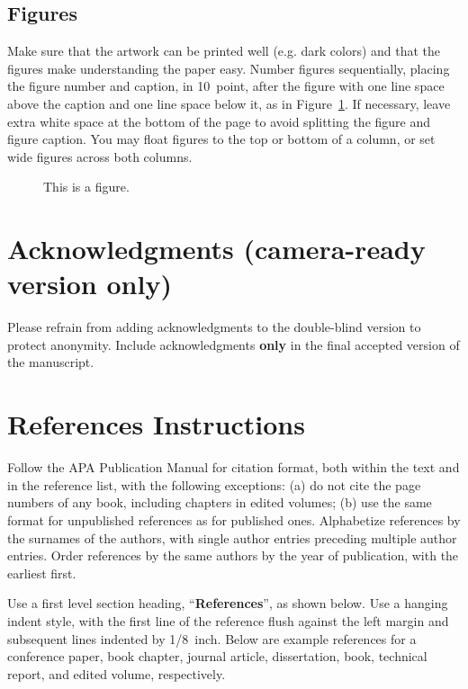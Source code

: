 \documentclass[10pt,letterpaper]{article}
\begin{document}
\subsection{Figures}

Make sure that the artwork can be printed well (e.g. dark colors) and that 
the figures make understanding the paper easy.
 Number figures sequentially, placing the figure
number and caption, in 10~point, after the figure with one line space
above the caption and one line space below it, as in
Figure~\ref{sample-figure}. If necessary, leave extra white space at
the bottom of the page to avoid splitting the figure and figure
caption. You may float figures to the top or bottom of a column, or
set wide figures across both columns.

\begin{figure}[ht]
\begin{center}
\end{center}
\caption{This is a figure.} 
\label{sample-figure}
\end{figure}


\section{Acknowledgments (camera-ready version only)}
Please refrain from adding acknowledgments to the double-blind version to protect anonymity. Include acknowledgments \textbf{only} in the final accepted version of the manuscript. 



\section{References Instructions}

Follow the APA Publication Manual for citation format, both within the
text and in the reference list, with the following exceptions: (a) do
not cite the page numbers of any book, including chapters in edited
volumes; (b) use the same format for unpublished references as for
published ones. Alphabetize references by the surnames of the authors,
with single author entries preceding multiple author entries. Order
references by the same authors by the year of publication, with the
earliest first.

Use a first level section heading, ``{\bf References}'', as shown
below. Use a hanging indent style, with the first line of the
reference flush against the left margin and subsequent lines indented
by 1/8~inch. Below are example references for a conference paper, book
chapter, journal article, dissertation, book, technical report, and
edited volume, respectively.

\nocite{ChalnickBillman1988a}
\nocite{Feigenbaum1963a}
\nocite{Hill1983a}
\nocite{OhlssonLangley1985a}
\nocite{Matlock2001}
\nocite{NewellSimon1972a}
\nocite{ShragerLangley1990a}


\newpage




\setlength{\bibleftmargin}{.125in}
\setlength{\bibindent}{-\bibleftmargin}


\end{document}

